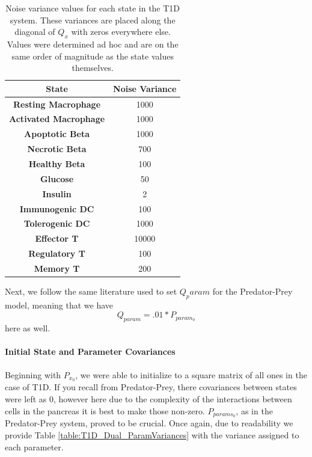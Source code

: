 \begin{table}[H]
  \begin{center}

    \begin{tabular}{c|c} %
      \textbf{State} & \textbf{Noise Variance} \\
      \hline
      \textbf{Resting Macrophage} & 1000\\
      \textbf{Activated Macrophage} & 1000\\
      \textbf{Apoptotic Beta} & 1000\\
      \textbf{Necrotic Beta} & 700\\
      \textbf{Healthy Beta} & 100\\
      \textbf{Glucose} & 50\\
      \textbf{Insulin} & 2\\
      \textbf{Immunogenic DC} & 100\\
      \textbf{Tolerogenic DC} & 1000\\
      \textbf{Effector T} & 10000\\
      \textbf{Regulatory T} & 100\\
      \textbf{Memory T} & 200
    \end{tabular}
    \caption{Noise variance values for each state in the T1D system. These variances are placed along the diagonal of $Q_x$ with zeros everywhere else. Values were determined ad hoc and are on the same order of magnitude as the state values themselves.}
    \label{table:T1D_Dual_StateNoiseVariances}
  \end{center}
\end{table}

Next, we follow the same literature used to set $Q_param$ for the Predator-Prey model, meaning that we have
\begin{equation}
Q_{param} = .01 * P_{param_0}
\end{equation}
here as well.

\paragraph{Initial State and Parameter Covariances}\label{section:T1D_Dual_InitialCovariances}
Beginning with $P_{x_0}$, we were able to initialize to a square matrix of all ones in the case of T1D. If you recall from Predator-Prey, there covariances between states were left as 0, however here due to the complexity of the interactions between cells in the pancreas it is best to make those non-zero. $P_{params_0}$, as in the Predator-Prey system, proved to be crucial. Once again, due to readability we provide Table \ref{table:T1D_Dual_ParamVariances} with the variance assigned to each parameter.



